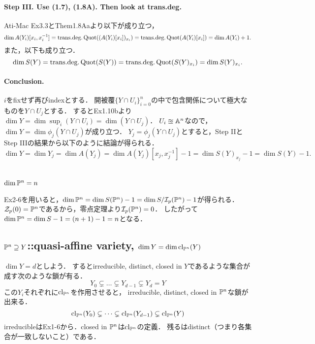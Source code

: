 \documentclass[a4paper]{jsarticle}
\newcommand{\transdeg}{\text{trans.deg.}}
\begin{document}
    \paragraph{Step III. Use (1.7), (1.8A). Then look at trans.deg.}
    Ati-Mac Ex3.3とThem1.8Aaより以下が成り立つ，
    \[ \dim A(Y_i)[x_i, x_i^{-1}]=\transdeg \Quot((A(Y_i)[x_i])_{x_i})=\transdeg \Quot(A(Y_i)[x_i])=\dim A(Y_i)+1. \]
    また，以下も成り立つ．
    \[ \dim S(Y)=\transdeg \Quot(S(Y))=\transdeg \Quot(S(Y)_{x_i})=\dim S(Y)_{x_i}. \]

    \paragraph{Conclusion.}
    $i$をfixせず再びindexとする．
    開被覆$\{Y \cap U_i\}_{i=0}^{n}$の中で包含関係について極大なものを$Y \cap U_j$とする．
    するとEx1.10bより$\dim Y=\dim \sup_i (Y \cap U_i)=\dim (Y \cap U_j)$．
    $U_i \approxeq \mathbb{A}^n$なので，$\dim Y=\dim \phi_j(Y \cap U_j)$が成り立つ．
    $Y_j=\phi_j(Y \cap U_j)$とすると，Step IIとStep IIIの結果から以下のように結論が得られる．
    \[ \dim Y=\dim Y_j=\dim A(Y_j)=\dim A(Y_j)[x_j, x_j^{-1}]-1=\dim S(Y)_{x_j}-1=\dim S(Y)-1. \]

\section{ } %
    \subsection{$\dim \mathbb{P}^n=n$}
    Ex2-6を用いると，$\dim \mathbb{P}^n=\dim S(\mathbb{P}^n)-1=\dim S/\mathcal{I}_p(\mathbb{P}^n)-1$が得られる．
    $\mathcal{Z}_p(0)=\mathbb{P}^n$であるから，零点定理より$\mathcal{I}_p(\mathbb{P}^n)=0$．
    したがって$\dim \mathbb{P}^n=\dim S-1=(n+1)-1=n$となる．

    \subsection{$\mathbb{P}^n \supseteq Y$::quasi-affine variety, $\dim Y=\dim \operatorname{cl}_{\mathbb{P}^n}(Y)$}
    $\dim Y=d$としよう．
    するとirreducible, distinct, closed in $Y$であるような集合が成す次のような鎖が有る．
    \[ Y_0 \subsetneq \dots \subsetneq Y_{d-1} \subsetneq Y_d=Y \]
    この$Y_i$それぞれに$\operatorname{cl}_{\mathbb{P}^n}$を作用させると，
    irreducible, distinct, closed in $\mathbb{P}^n$な鎖が出来る．
    \[ \operatorname{cl}_{\mathbb{P}^n}(Y_0) \subsetneq \dots \subsetneq \operatorname{cl}_{\mathbb{P}^n}(Y_{d-1}) \subsetneq \operatorname{cl}_{\mathbb{P}^n}(Y) \]
    irreducibleはEx1-6から．closed in $\mathbb{P}^n$は$\operatorname{cl}_{\mathbb{P}^n}$の定義．
    残るはdistinct（つまり各集合が一致しないこと）である．
    
\end{document}
